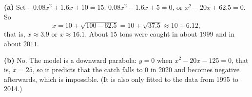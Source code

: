 \textbf{(a)} Set $-0.08x^2+1.6x+10=15$: $0.08x^2-1.6x+5=0$, or $x^2-20x+62.5=0$. So
\[x=10\pm\sqrt{100-62.5}=10\pm\sqrt{37.5}\approx10\pm6.12,\]
that is, $x\approx3.9$ or $x\approx16.1$. About $15$ tons were caught in about $\boxed{1999}$ and in about $\boxed{2011}$.

\textbf{(b)} No. The model is a downward parabola: $y=0$ when $x^2-20x-125=0$, that is, $x=25$, so it predicts that the catch falls to $0$ in 2020 and becomes negative afterwards, which is impossible. (It is also only fitted to the data from 1995 to 2014.)
